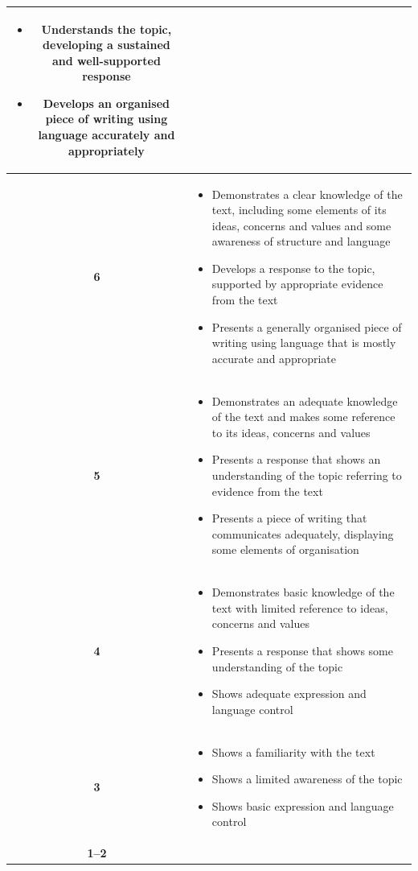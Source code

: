 \documentclass[a4paper]{article}
\begin{document}
\begin{longtable}{|c|p{13cm}|}
\begin{itemize}
  \item Understands the topic, developing a sustained and well-supported response
  \item Develops an organised piece of writing using language accurately and appropriately
\end{itemize} \\
\hline
\textbf{6} & 
\begin{itemize}
  \item Demonstrates a clear knowledge of the text, including some elements of its ideas, concerns and values and some awareness of structure and language
  \item Develops a response to the topic, supported by appropriate evidence from the text
  \item Presents a generally organised piece of writing using language that is mostly accurate and appropriate
\end{itemize} \\
\hline
\textbf{5} & 
\begin{itemize}
  \item Demonstrates an adequate knowledge of the text and makes some reference to its ideas, concerns and values
  \item Presents a response that shows an understanding of the topic referring to evidence from the text
  \item Presents a piece of writing that communicates adequately, displaying some elements of organisation
\end{itemize} \\
\hline
\textbf{4} & 
\begin{itemize}
  \item Demonstrates basic knowledge of the text with limited reference to ideas, concerns and values
  \item Presents a response that shows some understanding of the topic 
  \item Shows adequate expression and language control
\end{itemize} \\
\hline
\textbf{3} & 
\begin{itemize}
  \item Shows a familiarity with the text
  \item Shows a limited awareness of the topic 
  \item Shows basic expression and language control
\end{itemize} \\
\hline
\textbf{1--2} & 

\end{longtable}
\end{document}
